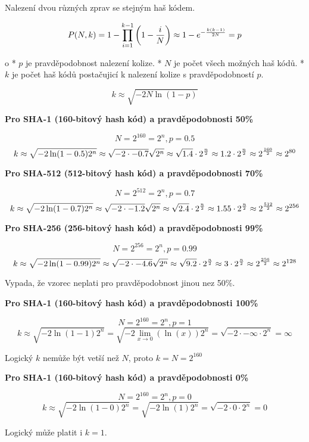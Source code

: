 Nalezení dvou různých zprav se stejným haš kódem.

$$
P(N,k) = 1 - \prod^{k-1}_{i=1}\left( 1 - {i \over N} \right)
\approx 1 - e^{-{k(k-1) \over 2N}}= p
$$

\begitems \style o
* $p$ je pravděpodobnost nalezení kolize.
* $N$ je počet všech možných haš kódů.
* $k$ je počet haš kódů postačujicí k nalezení kolize s pravděpodobností $p$.
\enditems

$$k \approx \sqrt{-2N\ln(1 - p)}$$

\bigskip\centerline
{\bf Pro SHA-1 (160-bitový hash kód) a pravděpodobnosti 50\%}

$$N = 2^{160} = 2^n, p = 0.5$$
$$
k \approx \sqrt{-2 \ln(1 - 0.5) 2^n} \approx \sqrt{-2 \cdot -0.7}\sqrt{2^n}
\approx \sqrt{1.4} \cdot 2^{n \over 2} \approx 1.2 \cdot 2^{n \over 2}
\approx 2^{160 \over 2} \approx 2^{80}
$$

\bigskip\centerline
{\bf Pro SHA-512 (512-bitový hash kód) a pravděpodobnosti 70\%}

$$N = 2^{512} = 2^n, p = 0.7$$
$$
k \approx \sqrt{-2 \ln(1 - 0.7) 2^n} \approx \sqrt{-2 \cdot -1.2}\sqrt{2^n}
\approx \sqrt{2.4} \cdot 2^{n \over 2} \approx 1.55 \cdot 2^{n \over 2}
\approx 2^{512 \over 2} \approx 2^{256}
$$

\bigskip\centerline
{\bf Pro SHA-256 (256-bitový hash kód) a pravděpodobnosti 99\%}

$$N = 2^{256} = 2^n, p = 0.99$$
$$
k \approx \sqrt{-2 \ln(1 - 0.99) 2^n} \approx \sqrt{-2 \cdot -4.6}\sqrt{2^n}
\approx \sqrt{9.2} \cdot 2^{n \over 2} \approx 3 \cdot 2^{n \over 2}
\approx 2^{256 \over 2} \approx 2^{128}
$$

\centerline{Vypada, že vzorec neplati pro pravděpodobnost jinou nez 50\%.}

\bigskip\centerline
{\bf Pro SHA-1 (160-bitový hash kód) a pravděpodobnosti 100\%}

$$N = 2^{160} = 2^n, p = 1$$
$$
k \approx \sqrt{-2 \ln(1 - 1) 2^n} = \sqrt{-2 \lim_{x \rightarrow 0} {(\ln(x))} 2^n}
= \sqrt{-2 \cdot -\infty \cdot 2^n} = \infty
$$

\centerline{Logický $k$ nemůže být vetší než $N$, proto $k = N = 2^{160}$}

\bigskip\centerline
{\bf Pro SHA-1 (160-bitový hash kód) a pravděpodobnosti 0\%}

$$N = 2^{160} = 2^n, p = 0$$
$$
k \approx \sqrt{-2 \ln(1 - 0) 2^n} = \sqrt{-2 \ln(1) 2^n}
= \sqrt{-2 \cdot 0 \cdot 2^n} = 0
$$

\centerline{Logický může platit i $k = 1$.}

